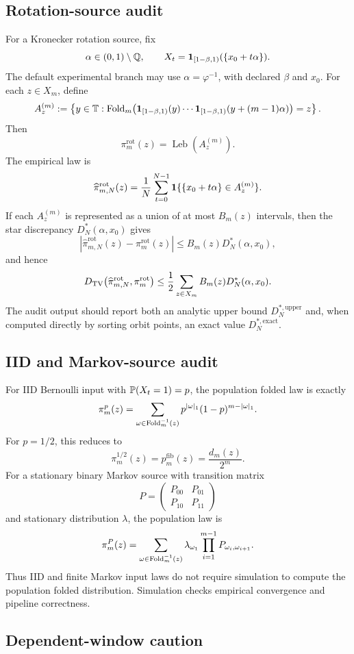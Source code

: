 \subsection{Rotation-source audit}

For a Kronecker rotation source, fix
\[
\alpha\in(0,1)\setminus\mathbb Q,
\qquad
X_t=\mathbf{1}_{[1-\beta,1)}(\{x_0+t\alpha\}).
\]
The default experimental branch may use \(\alpha=\varphi^{-1}\), with declared \(\beta\) and \(x_0\).  For each \(z\in X_m\), define
\[
A_z^{(m)}
:=
\left\{
y\in\mathbb T:
\operatorname{Fold}_m\bigl(
\mathbf{1}_{[1-\beta,1)}(y)
\cdots
\mathbf{1}_{[1-\beta,1)}(y+(m-1)\alpha)
\bigr)=z
\right\}.
\]
Then
\[
\pi_m^{\mathrm{rot}}(z)=\operatorname{Leb}(A_z^{(m)}).
\]
The empirical law is
\[
\widehat\pi_{m,N}^{\mathrm{rot}}(z)
=
\frac1N\sum_{t=0}^{N-1}\mathbf{1}\{\{x_0+t\alpha\}\in A_z^{(m)}\}.
\]
If each \(A_z^{(m)}\) is represented as a union of at most \(B_m(z)\) intervals, then the star discrepancy \(D_N^*(\alpha,x_0)\) gives
\[
\left|
\widehat\pi_{m,N}^{\mathrm{rot}}(z)-\pi_m^{\mathrm{rot}}(z)
\right|
\le
B_m(z)D_N^*(\alpha,x_0),
\]
and hence
\[
D_{\mathrm{TV}}\!\left(
\widehat\pi_{m,N}^{\mathrm{rot}},
\pi_m^{\mathrm{rot}}
\right)
\le
\frac12\sum_{z\in X_m}B_m(z)D_N^*(\alpha,x_0).
\]
The audit output should report both an analytic upper bound \(D_N^{*,\mathrm{upper}}\) and, when computed directly by sorting orbit points, an exact value \(D_N^{*,\mathrm{exact}}\).

\subsection{IID and Markov-source audit}

For IID Bernoulli input with \(\mathbb{P}(X_t=1)=p\), the population folded law is exactly
\[
\pi_m^p(z)
=
\sum_{\omega\in\operatorname{Fold}_m^{-1}(z)}
p^{|\omega|_1}(1-p)^{m-|\omega|_1}.
\]
For \(p=1/2\), this reduces to
\[
\pi_m^{1/2}(z)=p_m^{\mathrm{fib}}(z)=\frac{d_m(z)}{2^m}.
\]
For a stationary binary Markov source with transition matrix
\[
P=
\begin{pmatrix}
P_{00}&P_{01}\\
P_{10}&P_{11}
\end{pmatrix}
\]
and stationary distribution \(\lambda\), the population law is
\[
\pi_m^P(z)
=
\sum_{\omega\in\operatorname{Fold}_m^{-1}(z)}
\lambda_{\omega_1}\prod_{i=1}^{m-1}P_{\omega_i,\omega_{i+1}}.
\]
Thus IID and finite Markov input laws do not require simulation to compute the population folded distribution.  Simulation checks empirical convergence and pipeline correctness.

\subsection{Dependent-window caution}

